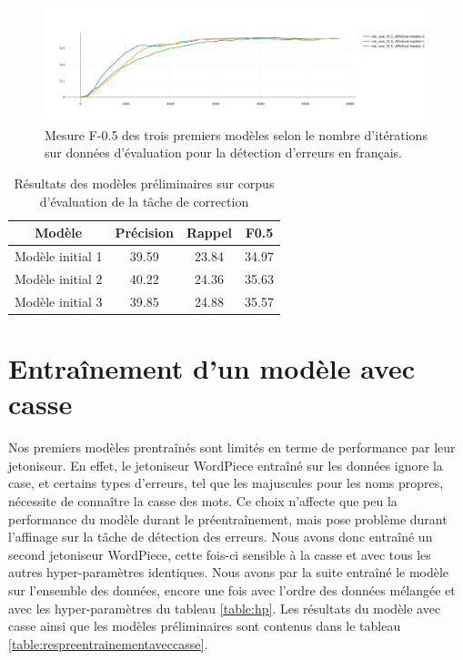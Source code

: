 \documentclass[12pt,twoside,maitrise]{dms}
\theoremstyle{definition}
\numberwithin{equation}{section}
\numberwithin{table}{chapter}
\numberwithin{figure}{chapter}
\begin{document}

\begin{figure}
	\begin{center}
		\includegraphics[width=1.40\textwidth]{figures/3premiersmodelesf05.png}
	\end{center}
	\caption{Mesure F-0.5 des trois premiers modèles selon le nombre d'itérations sur données d'évaluation pour la détection d'erreurs en français.}
	\label{fig:3premiermodeles}
\end{figure}


\begin{table}[h!]
	\centering
	\begin{tabular}{||c | c | c | c||}
		\hline
		Modèle           & Précision & Rappel & F0.5  \\ [0.5ex]
		\hline\hline
		Modèle initial 1 & 39.59     & 23.84  & 34.97 \\
		Modèle initial 2 & 40.22     & 24.36  & 35.63 \\
		Modèle initial 3 & 39.85     & 24.88  & 35.57 \\
		\hline
	\end{tabular}
	\caption{Résultats des modèles préliminaires sur corpus d'évaluation de la tâche de correction}
	\label{table:premiermodeles}
\end{table}


\section{Entraînement d'un modèle avec casse}

Nos premiers modèles prentraînés sont limités en terme de performance par leur
jetoniseur. En effet, le jetoniseur WordPiece entraîné sur les données ignore
la case, et certains types d'erreurs, tel que les majuscules pour les noms
propres, nécessite de connaître la casse des mots. Ce choix n'affecte que peu
la performance du modèle durant le préentraînement, mais pose problème durant
l'affinage sur la tâche de détection des erreurs. Nous avons donc entraîné un
second jetoniseur WordPiece, cette fois-ci sensible à la casse et avec tous les
autres hyper-paramètres identiques. Nous avons par la suite entraîné le modèle
sur l'ensemble des données, encore une fois avec l'ordre des données mélangée
et avec les hyper-paramètres du tableau \ref{table:hp}. Les résultats du modèle
avec casse ainsi que les modèles préliminaires sont contenus dans le tableau
\ref{table:respreentrainementaveccasse}.
\end{document}
